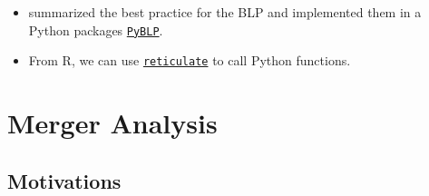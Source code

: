 \documentclass[
]{book}
\providecommand{\tightlist}{%
  \setlength{\itemsep}{0pt}\setlength{\parskip}{0pt}}
\begin{document}
\begin{itemize}
\tightlist
\item
  \citet{conlonBestPracticesDifferentiated2020} summarized the best practice for the BLP and implemented them in a Python packages \href{https://www.google.com/url?sa=t\&rct=j\&q=\&esrc=s\&source=web\&cd=\&ved=2ahUKEwjF0JvLlsv6AhXWP3AKHZEuCOkQFnoECBkQAQ\&url=https\%3A\%2F\%2Fpyblp.readthedocs.io\%2F\&usg=AOvVaw2N7G6WXZyh5rKPfD653rgI}{\texttt{PyBLP}}.
\item
  From R, we can use \href{https://rstudio.github.io/reticulate/}{\texttt{reticulate}} to call Python functions.
\end{itemize}

\hypertarget{merger}{%
\chapter{Merger Analysis}\label{merger}}

\hypertarget{motivations-2}{%
\section{Motivations}\label{motivations-2}}
\end{document}
